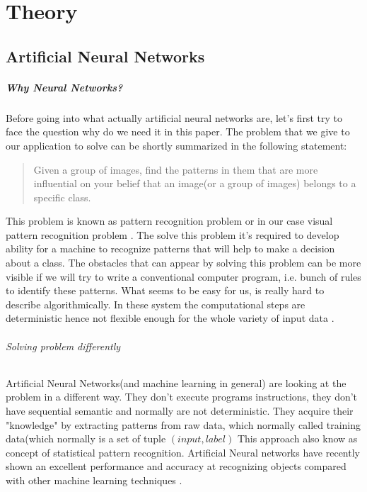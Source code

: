 \chapter{Theory}
\section{Artificial Neural Networks}
\paragraph{Why Neural Networks?}
Before going into what actually artificial neural networks are, let's first
try to face the question why do we need it in this paper. The problem that
we give to our application to solve can be shortly summarized in the following statement:
\blockquote{
Given a group of images, find the patterns in them that are more influential
on your belief that an image(or a group of images) belongs to a specific class.
}


This problem is known as pattern recognition problem or in our case
visual pattern recognition problem \cite{Bishop1995}.
The solve this problem it's required to develop ability for a machine
to recognize patterns that will help to make a decision about a class.
The obstacles that can appear by solving this problem can be more visible
if we will try to write a conventional computer program, i.e. bunch of rules
to identify these patterns. What seems to be easy for us, is really hard to describe
algorithmically. In these system the computational steps are deterministic
hence not flexible enough for the whole variety of input data \cite{Nielsen2015}.

\subparagraph{Solving problem differently}
Artificial Neural Networks(and machine learning in general) are looking at the problem
in a different way.
They don't execute programs instructions, they don't have
sequential semantic and normally are not
deterministic. They acquire their "knowledge" by extracting patterns from raw data,
which normally called training data(which normally is a set of tuple $(input, label)$
This approach also know as concept of statistical pattern recognition. \cite{Bishop1995}
Artificial Neural networks have recently shown an excellent performance and
accuracy at recognizing objects compared with other
machine learning techniques \cite{Krizhevsky2012}.


